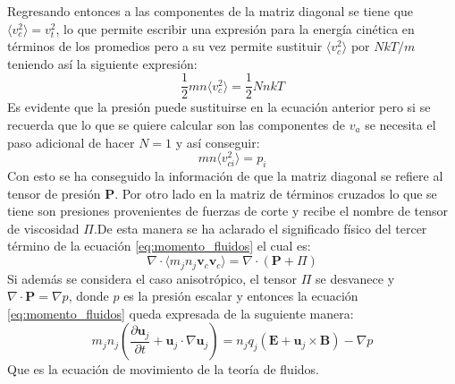 \documentclass[../tesis_main_file.tex]{subfiles}
\begin{document}
Regresando entonces a las componentes de la matriz diagonal se tiene que $\langle v_c^2\rangle=v_t^2$, lo que permite escribir una expresión para la energía cinética en términos de los promedios pero a su vez permite sustituir $\langle v_c^2\rangle$ por $NkT/m$ teniendo así la siguiente expresión:
\begin{equation}
\frac{1}{2}mn \langle v_c^2\rangle = \frac{1}{2}NnkT
\end{equation}
Es evidente que la presión puede sustituirse en la ecuación anterior pero si se recuerda que lo que se quiere calcular son las componentes de $v_a$ se necesita el paso adicional de hacer $N=1$ y así conseguir:
\begin{equation}
mn \langle v_{ci}^2\rangle = p_i
\end{equation} 
Con esto se ha conseguido la información de que la matriz diagonal se refiere al tensor de presión \textbf{P}. Por otro lado en la matriz de términos cruzados lo que se tiene son presiones provenientes de fuerzas de corte \cite{bittencourt2013fundamentals} y recibe el nombre de tensor de viscosidad \textbf{$\Pi$}.De esta manera se ha aclarado el significado físico del tercer término de la ecuación \ref{eq:momento_fluidos} el cual es:
\begin{equation}
\label{eq:tensor_p_vis}
\nabla \cdot \langle m_jn_j \textbf{v}_c \textbf{v}_c \rangle= \nabla \cdot (\textbf{P}+ \Pi)
\end{equation}
Si además se considera el caso anisotrópico, el tensor $\Pi$ se desvanece y $\nabla \cdot \textbf{P}=\nabla p$, donde $p$ es la presión escalar y entonces la ecuación \ref{eq:momento_fluidos} queda expresada de la suguiente manera:
\begin{equation}
\label{eq:movimiento_reducida}
m_jn_j \left( \frac{\partial \textbf{u}_j}{\partial t}+\textbf{u}_j\cdot \nabla \textbf{u}_j \right)= n_jq_j(\textbf{E}+\textbf{u}_j\times \textbf{B})- \nabla p
\end{equation}
Que es la ecuación de movimiento de la teoría de fluidos.
\end{document}
